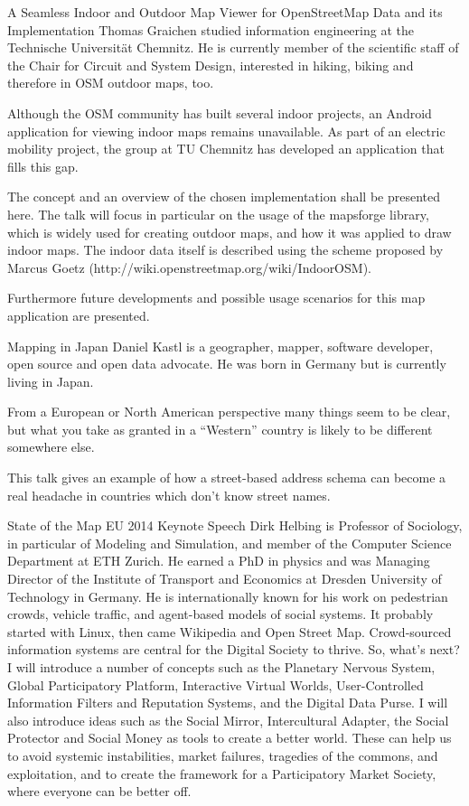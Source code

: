 %
{A Seamless Indoor and Outdoor Map Viewer for OpenStreetMap Data and its Implementation}%
{Thomas Graichen studied information engineering at the Technische Universität Chemnitz. He is currently member of the scientific staff of the Chair for Circuit and System Design, interested in hiking, biking and therefore in OSM outdoor maps, too.}%
{Although the OSM community has built several indoor projects, an Android application for viewing indoor maps remains unavailable. As part of an electric mobility project, the group at TU Chemnitz has developed an application that fills this gap.

The concept and an overview of the chosen implementation shall be presented here. The talk will focus in particular on the usage of the mapsforge library, which is widely used for creating outdoor maps, and how it was applied to draw indoor maps. The indoor data itself is described using the scheme proposed by Marcus Goetz (http://wiki.openstreetmap.org/wiki/IndoorOSM).

Furthermore future developments and possible usage scenarios for this map application are presented.}

%
{Mapping in Japan}%
{Daniel Kastl is a geographer, mapper, software developer, open source and open data advocate. He was born in Germany but is currently living in Japan.}%
{From a European or North American perspective many things seem to be clear, but what you take as granted in a ``Western'' country is likely to be different somewhere else.

This talk gives an example of how a street-based address schema can become a real headache in countries which don't know street names.}

%
{State of the Map EU 2014 Keynote Speech}%
{Dirk Helbing is Professor of Sociology, in particular of Modeling and 
Simulation, and member of the Computer Science Department at ETH Zurich. 
He earned a PhD in physics and was Managing Director of the Institute of 
Transport and Economics at Dresden University of Technology in Germany. 
He is internationally known for his work on pedestrian crowds, vehicle 
traffic, and agent-based models of social systems.  }%
{It probably started with Linux, then came Wikipedia and Open Street Map. 
Crowd-sourced information systems
are central for the Digital Society to thrive. So, what's next? 
I will introduce a number of concepts such as
the Planetary Nervous System, Global Participatory Platform, 
Interactive Virtual Worlds, User-Controlled
Information Filters and Reputation Systems, and the Digital Data Purse. 
I will also introduce ideas such as the Social Mirror, 
Intercultural Adapter, 
the Social Protector and Social Money as tools to create a better world. 
These can help us to avoid systemic instabilities, market failures, 
tragedies of the commons, and exploitation, and to create the framework 
for a Participatory Market Society, where everyone can be better off.}


